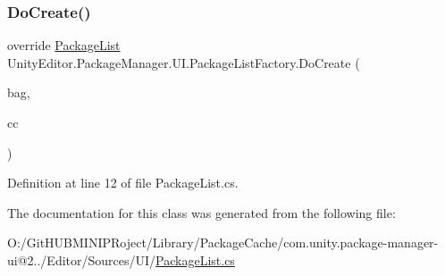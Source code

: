 \subsubsection{\texorpdfstring{DoCreate()}{DoCreate()}}
{\footnotesize\ttfamily override \mbox{\hyperlink{class_unity_editor_1_1_package_manager_1_1_u_i_1_1_package_list}{Package\+List}} Unity\+Editor.\+Package\+Manager.\+U\+I.\+Package\+List\+Factory.\+Do\+Create (\begin{DoxyParamCaption}\item[{I\+Uxml\+Attributes}]{bag,  }\item[{Creation\+Context}]{cc }\end{DoxyParamCaption})\hspace{0.3cm}{\ttfamily [protected]}}



Definition at line 12 of file Package\+List.\+cs.



The documentation for this class was generated from the following file\+:\begin{DoxyCompactItemize}
\item 
O\+:/\+Git\+H\+U\+B\+M\+I\+N\+I\+P\+Roject/\+Library/\+Package\+Cache/com.\+unity.\+package-\/manager-\/ui@2../\+Editor/\+Sources/\+U\+I/\mbox{\hyperlink{_package_list_8cs}{Package\+List.\+cs}}\end{DoxyCompactItemize}
